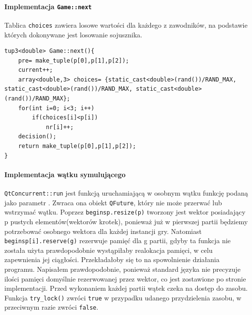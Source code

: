 \paragraph{Implementacja \texttt{Game::next}}
Tablica \texttt{choices} zawiera losowe wartości dla każdego z zawodników, na podstawie których dokonywane jest losowanie sojusznika.
\begin{lstlisting}
tup3<double> Game::next(){
    pre= make_tuple(p[0],p[1],p[2]);
    current++;
    array<double,3> choices= {static_cast<double>(rand())/RAND_MAX, static_cast<double>(rand())/RAND_MAX, static_cast<double>(rand())/RAND_MAX};
    for(int i=0; i<3; i++)
        if(choices[i]<p[i])
            nr[i]++;
    decision();
    return make_tuple(p[0],p[1],p[2]);
}
\end{lstlisting}

\paragraph{Implementacja wątku symulującego} \texttt{QtConcurrent::run} jest funkcją uruchamiającą w osobnym wątku funkcję podaną jako parametr \cite{Qt}. Zwraca ona obiekt \texttt{QFuture}, który nie może przerwać lub wstrzymać wątku. Poprzez \texttt{beginsp.resize(p)} tworzony jest wektor posiadający p pustych elementów(wektorów krotek), ponieważ już w pierwszej partii będziemy potrzebować osobnego wektora dla każdej instancji gry. Natomiast \texttt{beginsp[i].reserve(g)} rezerwuje pamięć dla g partii, gdyby ta funkcja nie została użyta prawdopodobnie wystąpiłaby realokacja pamięci, w celu zapewnienia jej ciągłości. Przekładałoby się to na spowolnienie działania programu. Napisałem prawdopodobnie, ponieważ standard języka nie precyzuje ilości pamięci domyślnie rezerwowanej przez wektor, co jest zostawione po stronie implementacji. Przed wykonaniem każdej partii wątek czeka na dostęp do zasobu. Funkcja \texttt{try\_lock()} zwróci \texttt{true} w przypadku udanego przydzielenia zasobu, w przeciwnym razie zwróci \texttt{false}. 
